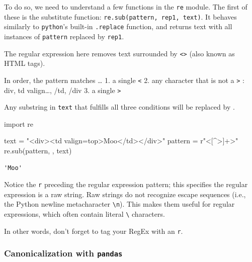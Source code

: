 \documentclass[
  letterpaper,
  DIV=11,
  numbers=noendperiod]{scrreprt}
\newenvironment{Shaded}{\begin{snugshade}}{\end{snugshade}}
\newcommand{\ImportTok}[1]{\textcolor[rgb]{0.00,0.46,0.62}{#1}}
\newcommand{\NormalTok}[1]{\textcolor[rgb]{0.00,0.23,0.31}{#1}}
\newcommand{\OperatorTok}[1]{\textcolor[rgb]{0.37,0.37,0.37}{#1}}
\newcommand{\StringTok}[1]{\textcolor[rgb]{0.13,0.47,0.30}{#1}}
\newcommand{\VerbatimStringTok}[1]{\textcolor[rgb]{0.13,0.47,0.30}{#1}}
\begin{document}
To do so, we need to understand a few functions in the \texttt{re}
module. The first of these is the substitute function:
\texttt{re.sub(pattern,\ rep1,\ text)}. It behaves similarly to
\texttt{python}'s built-in \texttt{.replace} function, and returns text
with all instances of \texttt{pattern} replaced by \texttt{rep1}.

The regular expression here removes text surrounded by
\texttt{\textless{}\textgreater{}} (also known as HTML tags).

In order, the pattern matches \ldots{} 1. a single \texttt{\textless{}}
2. any character that is not a \texttt{\textgreater{}} : div, td
valign\ldots, /td, /div 3. a single \texttt{\textgreater{}}

Any substring in \texttt{text} that fulfills all three conditions will
be replaced by \texttt{\textquotesingle{}\textquotesingle{}}.

\begin{Shaded}
\begin{Highlighting}[]
\ImportTok{import}\NormalTok{ re}

\NormalTok{text }\OperatorTok{=} \StringTok{"\textless{}div\textgreater{}\textless{}td valign=\textquotesingle{}top\textquotesingle{}\textgreater{}Moo\textless{}/td\textgreater{}\textless{}/div\textgreater{}"}
\NormalTok{pattern }\OperatorTok{=} \VerbatimStringTok{r"\textless{}[\^{}\textgreater{}]+\textgreater{}"}
\NormalTok{re.sub(pattern, }\StringTok{\textquotesingle{}\textquotesingle{}}\NormalTok{, text) }
\end{Highlighting}
\end{Shaded}

\begin{verbatim}
'Moo'
\end{verbatim}

Notice the \texttt{r} preceding the regular expression pattern; this
specifies the regular expression is a raw string. Raw strings do not
recognize escape sequences (i.e., the Python newline metacharacter
\texttt{\textbackslash{}n}). This makes them useful for regular
expressions, which often contain literal \texttt{\textbackslash{}}
characters.

In other words, don't forget to tag your RegEx with an \texttt{r}.

\subsubsection{\texorpdfstring{Canonicalization with
\texttt{pandas}}{Canonicalization with pandas}}\label{canonicalization-with-pandas}
\end{document}
